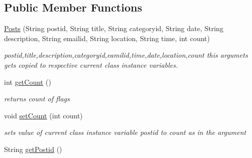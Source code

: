 \subsection*{\-Public \-Member \-Functions}
\begin{DoxyCompactItemize}
\item 
\hyperlink{classcom_1_1example_1_1sel_1_1lostfound_1_1Posts_adc28f0ba0037eb0ce8b0eaa897ebe9ac}{\-Posts} (\-String postid, \-String title, \-String categoryid, \-String date, \-String description, \-String emailid, \-String location, \-String time, int count)
\begin{DoxyCompactList}\small\item\em postid,title,description,categoryid,eamilid,time,date,location,count this argumets gets copied to respective current class instance variables. \end{DoxyCompactList}\item 
\hypertarget{classcom_1_1example_1_1sel_1_1lostfound_1_1Posts_ace0127999b83586aa9c8019f90d0681c}{int \hyperlink{classcom_1_1example_1_1sel_1_1lostfound_1_1Posts_ace0127999b83586aa9c8019f90d0681c}{get\-Count} ()}\label{classcom_1_1example_1_1sel_1_1lostfound_1_1Posts_ace0127999b83586aa9c8019f90d0681c}

\begin{DoxyCompactList}\small\item\em returns count of flags \end{DoxyCompactList}\item 
void \hyperlink{classcom_1_1example_1_1sel_1_1lostfound_1_1Posts_a4f66f3e0397b6633e77dda40e5319acc}{set\-Count} (int count)
\begin{DoxyCompactList}\small\item\em sets value of current class instance variable postid to count as in the argument \end{DoxyCompactList}\item 
\hypertarget{classcom_1_1example_1_1sel_1_1lostfound_1_1Posts_a1943a37420938d7c76fbeccef90c731a}{\-String \hyperlink{classcom_1_1example_1_1sel_1_1lostfound_1_1Posts_a1943a37420938d7c76fbeccef90c731a}{get\-Postid} ()}\label{classcom_1_1example_1_1sel_1_1lostfound_1_1Posts_a1943a37420938d7c76fbeccef90c731a}


\end{DoxyCompactItemize}
